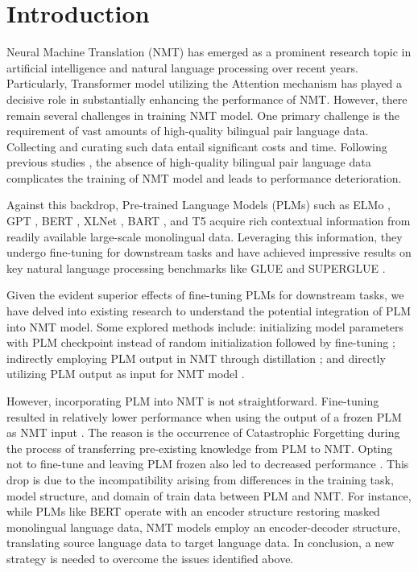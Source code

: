 \documentclass[conference]{IEEEtran}
\begin{document}
\section{Introduction}
 Neural Machine Translation (NMT) has emerged as a prominent research topic in artificial intelligence and natural language processing over recent years. Particularly, Transformer model \cite{vaswani2017attention} utilizing the Attention mechanism has played a decisive role in substantially enhancing the performance of NMT. However, there remain several challenges in training NMT model. One primary challenge is the requirement of vast amounts of high-quality bilingual pair language data. Collecting and curating such data entail significant costs and time. Following previous studies \cite{edunov2019pretrained, koehn2017six}, the absence of high-quality bilingual pair language data complicates the training of NMT model and leads to performance deterioration.

Against this backdrop, Pre-trained Language Models (PLMs) such as ELMo \cite{peters2018elmo}, GPT \cite{radford2018gpt}, BERT \cite{devlin2019bert}, XLNet \cite{yang2019xlnet}, BART \cite{lewis2019bart}, and T5 \cite{raffel2020texttotext} acquire rich contextual information from readily available large-scale monolingual data. Leveraging this information, they undergo fine-tuning for downstream tasks and have achieved impressive results on key natural language processing benchmarks like GLUE \cite{wang2018glue} and SUPERGLUE \cite{sarlin2020superglue}.

Given the evident superior effects of fine-tuning PLMs for downstream tasks, we have delved into existing research to understand the potential integration of PLM into NMT model. Some explored methods include: initializing model parameters with PLM checkpoint instead of random initialization followed by fine-tuning \cite{Ramachandran2016, Lample2019, clinchant2019bertnmt, rothe2020leveraging, Ma2020}; indirectly employing PLM output in NMT through distillation \cite{Yang2019, weng2020acquiring}; and directly utilizing PLM output as input for NMT model \cite{clinchant2019bertnmt, zhu2020incorporating, weng2020acquiring, xu2021bibert}.

However, incorporating PLM into NMT is not straightforward. Fine-tuning resulted in relatively lower performance when using the output of a frozen PLM as NMT input \cite{zhu2020incorporating}. The reason is the occurrence of Catastrophic Forgetting \cite{goodfellow2013empirical} during the process of transferring pre-existing knowledge from PLM to NMT. Opting not to fine-tune and leaving PLM frozen also led to decreased performance \cite{clinchant2019bertnmt}. This drop is due to the incompatibility arising from differences in the training task, model structure, and domain of train data between PLM and NMT. For instance, while PLMs like BERT \cite{devlin2019bert} operate with an encoder structure restoring masked monolingual language data, NMT models employ an encoder-decoder structure, translating source language data to target language data. In conclusion, a new strategy is needed to overcome the issues identified above.
\end{document}
